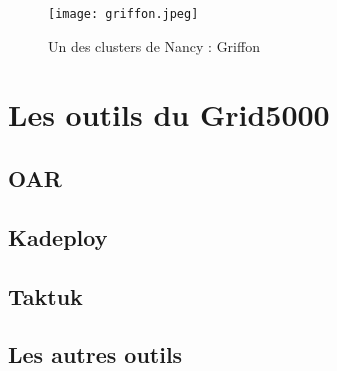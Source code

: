 \documentclass [10pt,a4paper]{report}
\begin{document}
\begin{figure}[!h]
		\centering
   		\texttt{[image: griffon.jpeg]}
   		\caption{Un des clusters de Nancy : Griffon}
    	\label{fig:griffon}
	\end{figure} 

	\section{Les outils du Grid5000}
		\subsection{OAR}	
		\subsection{Kadeploy}
		\subsection{Taktuk}
		\subsection{Les autres outils}
		
\end{document}
